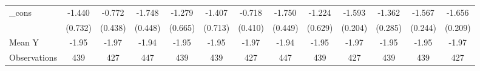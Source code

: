 {\begin{tabular}{l*{12}{c}}
\addlinespace
\_cons      &      -1.440\sym{*}  &      -0.772\sym{*}  &      -1.748\sym{***}&      -1.279\sym{*}  &      -1.407\sym{*}  &      -0.718\sym{*}  &      -1.750\sym{***}&      -1.224\sym{*}  &      -1.593\sym{***}&      -1.362\sym{***}&      -1.567\sym{***}&      -1.656\sym{***}\\
            &     (0.732)         &     (0.438)         &     (0.448)         &     (0.665)         &     (0.713)         &     (0.410)         &     (0.449)         &     (0.629)         &     (0.204)         &     (0.285)         &     (0.244)         &     (0.209)         \\
\midrule
Mean Y      &       -1.95         &       -1.97         &       -1.94         &       -1.95         &       -1.95         &       -1.97         &       -1.94         &       -1.95         &       -1.97         &       -1.95         &       -1.95         &       -1.97         \\
Observations&         439         &         427         &         447         &         439         &         439         &         427         &         447         &         439         &         427         &         439         &         439         &         427         \\
\bottomrule
\end{tabular}
}
